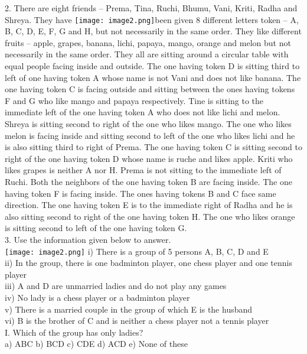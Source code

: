\documentclass[
]{article}
\begin{document}
2. There are eight friends – Prema, Tina, Ruchi, Bhumu, Vani, Kriti, Radha and Shreya. They
have \texttt{[image: image2.png]}been given 8 different letters token – A, B, C, D, E, F, G and H, but not necessarily in
the same order. They like different fruits – apple, grapes, banana, lichi, papaya, mango,
orange and melon but not necessarily in the same order. They all are sitting around a
circular table with equal people facing inside and outside. The one having token D is sitting
third to left of one having token A whose name is not Vani and does not like banana. The
one having token C is facing outside and sitting between the ones having tokens F and G
who like mango and papaya respectively. Tine is sitting to the immediate left of the one
having token A who does not like lichi and melon. Shreya is sitting second to right of the
one who likes mango. The one who likes melon is facing inside and sitting second to left of
the one who likes lichi and he is also sitting third to right of Prema. The one having token C
is sitting second to right of the one having token D whose name is ruche and likes apple.
Kriti who likes grapes is neither A nor H. Prema is not sitting to the immediate left of
Ruchi. Both the neighbors of the one having token B are facing inside. The one having token
F is facing inside. The ones having tokens B and C face same direction. The one having
token E is to the immediate right of Radha and he is also sitting second to right of the one
having token H. The one who likes orange is sitting second to left of the one having token G.\\

3. Use the information given below to answer.\\
\texttt{[image: image2.png]}
i) There is a group of 5 persons A, B, C, D and E\\
ii) In the group, there is one badminton player, one chess player and one tennis player\\
iii) A and D are unmarried ladies and do not play any games\\
iv) No lady is a chess player or a badminton player\\
v) There is a married couple in the group of which E is the husband\\
vi) B is the brother of C and is neither a chess player not a tennis player\\

I. Which of the group has only ladies?\\
a) ABC \hspace{2mm}b) BCD \hspace{2mm}c) CDE \hspace{2mm}d) ACD \hspace{2mm}e) None of these\\
\end{document}
